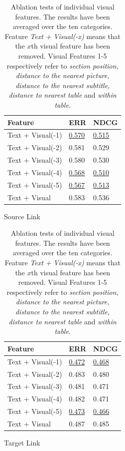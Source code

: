 \begin{table}[h]
    \begin{subtable}[h]{0.45\textwidth}
        \centering
        \begin{tabular}{l | l | l}
        Feature & ERR & NDCG \\
        \hline \hline
        Text + Visual(-1) & \underline{0.570} & \underline{0.515} \\
        Text + Visual(-2) & 0.581 & 0.529 \\
        Text + Visual(-3) & 0.580 & 0.530 \\
        Text + Visual(-4) & \underline{0.568} & \underline{0.510} \\
        Text + Visual(-5) & \underline{0.567} & \underline{0.513} \\
        Text + Visual     & 0.583 & 0.536 \\
       \end{tabular}
       \caption{Source Link}
       \label{table_cmp9}
    \end{subtable}
    \hfill
    \begin{subtable}[h]{0.45\textwidth}
        \centering
        \begin{tabular}{l | l | l}
        Feature & ERR & NDCG \\
        \hline \hline
        Text + Visual(-1) & \underline{0.472} & \underline{0.468} \\
        Text + Visual(-2) & 0.483 & 0.480 \\
        Text + Visual(-3) & 0.481 & 0.471 \\
        Text + Visual(-4) & 0.482 & 0.471 \\
        Text + Visual(-5) & \underline{0.473} & \underline{0.466} \\
        Text + Visual     & 0.487 & 0.485 \\
       \end{tabular}
        \caption{Target Link}
        \label{table_cmp10}
     \end{subtable}
     \caption{Ablation tests of individual visual features. The results have been averaged over the ten categories. Feature \emph{Text + Visual(-x)} means that the $x$th visual feature has been removed. Visual Features 1-5 respectively refer to \textit{section position, distance to the nearest picture, distance to the nearest subtitle, distance to nearest table} and \textit{within table}.}
     \label{table_cmp11}
\end{table}

